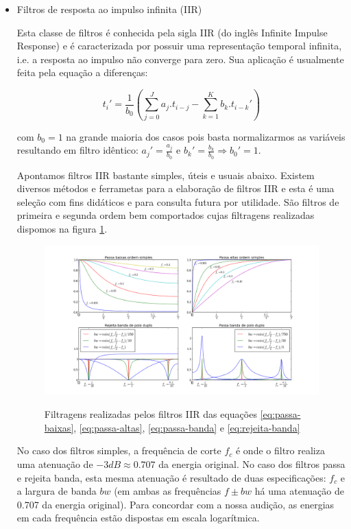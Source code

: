 \begin{itemize}
\item Filtros de resposta ao impulso infinita (IIR)

Esta classe de filtros é
conhecida pela sigla IIR (do inglês Infinite Impulse Response)
e é caracterizada por possuir uma representação temporal
infinita, i.e. a resposta ao impulso não converge para zero. Sua aplicação é usualmente feita pela equação
a diferenças:

\begin{equation}
t_i' = \frac{1}{b_0}\left ( \sum_{j=0}^Ja_j . t_{i-j} - \sum_{k=1}^Kb_k . t_{i-k}' \right )
\end{equation}

com $b_0=1$ na grande maioria dos casos pois basta normalizarmos as variáveis
resultando em filtro idêntico: $a_j'=\frac{a_j}{b_0}$ e $b_k'=\frac{b_k}{b_0} \Rightarrow b_0' = 1$.

Apontamos filtros IIR bastante simples, úteis e usuais abaixo. Existem
diversos métodos e ferrametas para a elaboração de filtros IIR
e esta é uma seleção com fins didáticos e para consulta futura por
utilidade.
São filtros de primeira e segunda ordem bem comportados cujas
filtragens realizadas dispomos na figura \ref{fig:iir}.

\begin{figure}[h!]
    \centering
    \caption{Filtragens realizadas pelos filtros IIR das equações \ref{eq:passa-baixas}, \ref{eq:passa-altas}, \ref{eq:passa-banda} e \ref{eq:rejeita-banda}}
        \includegraphics[width=\textwidth]{figuras/iir_}
        \label{fig:iir}
\end{figure}

No caso dos filtros simples, a frequência de corte $f_c$ é onde 
o filtro realiza uma atenuação de $-3dB \approx 0.707 $ da energia original.
No caso dos filtros passa e rejeita banda, esta mesma atenuação é
resultado de duas especificações: $f_c$ e a largura de banda $bw$
(em ambas as frequências $f \pm bw$ há uma atenuação de 0.707 da energia original).
Para concordar com a nossa audição, as energias em cada frequência estão dispostas em escala
logarítmica.


\end{itemize}
